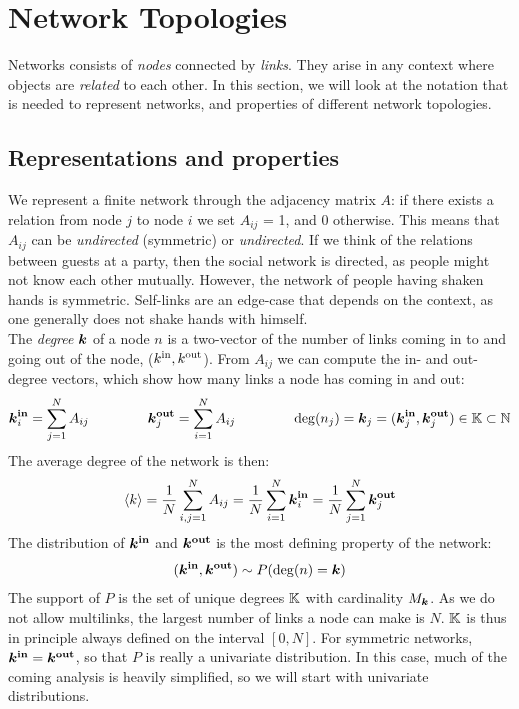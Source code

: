 \newpage
\section{\theory Network Topologies} \label{sec:NetworkTopologies}

Networks consists of \textsl{nodes} connected by \textsl{links}. They arise in any context where objects are \textsl{related} to each other. In this section, we will look at the notation that is needed to represent networks, and properties of different network topologies.

\subsection{Representations and properties}
We represent a finite network through the adjacency matrix $A$: if there exists a relation from node $j$ to node $i$ we set $A_{ij} $ = 1, and 0 otherwise. This means that $A_{ij}$ can be \textsl{undirected} (symmetric) or \textsl{undirected}. If we think of the relations between guests at a party, then the social network is directed, as people might not know each other mutually. However, the network of people having shaken hands is symmetric. Self-links are an edge-case that depends on the context, as one generally does not shake hands with himself. \\
The \textsl{degree} ${\boldsymbol{k}}$ of a node $n$  is a two-vector of the number of links coming in to and going out of the node, (${k^{\rm in}}, {k^{\rm out}}$). From $A_{ij}$ we can compute the in- and out-degree vectors, which show how many links a node has coming in and out:
\begin{align}
\kinbi = \sum_{j=1}^{N} A_{i j} \hspace{15mm} \koutbj = \sum_{i=1}^{N} A_{i j}  \hspace{15mm} \degree(n_j) = \k_j = (\boldsymbol{k}_j^{\bf in}, \koutbj) \in \K \subset \mathbb{N} \label{eq:definekinkoutfromA} 
\end{align}
The average degree of the network is then: 
\begin{align}
{\langle k\rangle} = \frac{1}{N} \sum_{i,j=1}^{N} A_{ij} = \frac{1}{N} \sum_{i=1}^{N} {\boldsymbol{k}_i^{\bf in}} = \frac{1}{N} \sum_{j=1}^{N} {\boldsymbol{k}_j^{\bf out}} \label{eq:kmean} 
\end{align}
The distribution of ${\boldsymbol{k^{\rm in}}}$ and $\boldsymbol{{k^{\rm out}}}$ is the most defining property of the network:
\begin{align}
({\boldsymbol{k^{\rm in}}}, \boldsymbol{{k^{\rm out}}}) \sim P({\rm deg}(n) = {\boldsymbol{k}}) \label{eq:definekinkoutfromP} 
\end{align}
The support of $P$ is the set of unique degrees ${\mathbb{K}}$ with cardinality $M_{\boldsymbol{k}}$. As we do not allow multilinks, the largest number of links a node can make is $N$. ${\mathbb{K}}$ is thus in principle always defined on the interval $[0,N]$. For symmetric networks, ${\boldsymbol{k^{\rm in}}} = \boldsymbol{{k^{\rm out}}}$, so that $P$ is really a univariate distribution. In this case, much of the coming analysis is heavily simplified, so we will start with univariate distributions.


